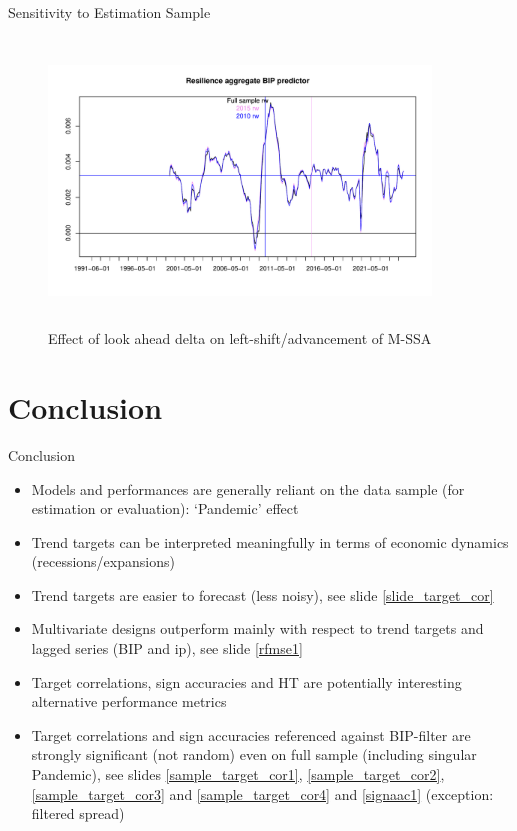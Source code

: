 \documentclass{beamer}
\begin{document}
\begin{frame} {Sensitivity to Estimation Sample}
\begin{figure}[H]\begin{center}\includegraphics[height=3in, width=4in]{bip_predictor_sensitivity.pdf}\caption{Effect of look ahead delta on  left-shift/advancement of M-SSA\label{cor}}\end{center}\end{figure}\end{frame}



  






\section{Conclusion}

\frame{\sectionpage}




\begin{frame} {Conclusion}
\begin{itemize}
\item Models and performances are generally reliant on the data sample (for estimation or evaluation): `Pandemic' effect
\item Trend targets can be interpreted meaningfully in terms of economic dynamics (recessions/expansions)
\item Trend targets are easier to forecast (less noisy), see slide \eqref{slide_target_cor}
\item Multivariate designs outperform mainly with respect to trend targets and lagged series (BIP and ip), see slide \eqref{rfmse1}
\item Target correlations, sign accuracies and HT are potentially interesting alternative performance metrics
\item Target correlations and sign accuracies referenced against BIP-filter are strongly significant (not random) even on full sample (including singular Pandemic), see slides  \eqref{sample_target_cor1}, \eqref{sample_target_cor2}, \eqref{sample_target_cor3} and \eqref{sample_target_cor4}  and \eqref{signaac1}  (exception: filtered spread)
\end{itemize}
\end{frame}
\end{document}
